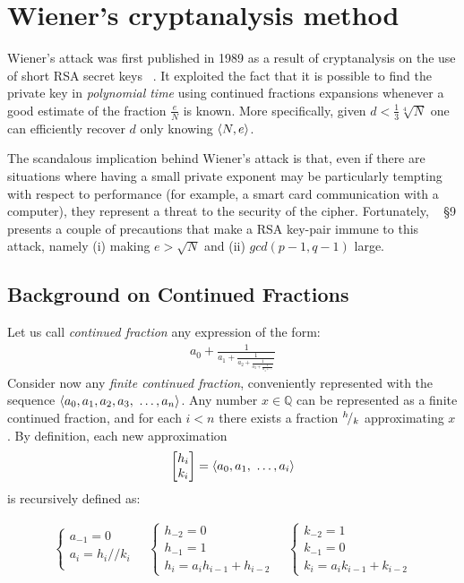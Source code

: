 \chapter{Wiener's cryptanalysis method \label{chap:wiener}}

Wiener's attack was first published in 1989 as a result of cryptanalysis on the
use of short RSA secret keys ~\cite{wiener}. It exploited the fact that it is
possible to find the private key in \emph{polynomial time} using continued fractions
expansions whenever a good estimate of the fraction $\frac{e}{N}$ is known.
More specifically, given $d < \frac{1}{3} \sqrt[4]{N}$ one can efficiently
recover $d$ only knowing $\langle N, e\rangle$.

The scandalous implication behind Wiener's attack is that, even if there are
situations where having a small private exponent may be
particularly tempting with respect to performance (for example, a smart card
communication with a computer), they represent a threat to the security of the
cipher.
Fortunately, ~\cite{wiener} \S 9 presents a couple of precautions that make a
RSA key-pair immune to this attack, namely
(i) making $e > \sqrt{N}$ and
(ii) $gcd(p-1, q-1)$ large.

\section{Background on Continued Fractions \label{sec:wiener:cf}}

Let us call \emph{continued fraction} any expression of the form:
\begin{align*}
a_0 + \frac{1}{a_1
    + \frac{1}{a_2
    + \frac{1}{a_3
    + \frac{1}{a_4 + \ldots}}}}
\end{align*}
Consider now any \emph{finite continued fraction}, conveniently represented with
the sequence
$\angular{a_0, a_1, a_2, a_3,  \ \ldots, a_n}$.
Any number $x \in \mathbb{Q}$ can be represented as a finite continued fraction,
and for each $i < n$ there exists a fraction ${}^{h}\!/_{k}$ approximating
$x$.
By definition, each new approximation
$$
\begin{bmatrix}
  h_i \\ k_i
\end{bmatrix}
=
\langle a_0, a_1, \ \ldots, a_i\rangle
$$
is recursively defined as:

\begin{align}
  \label{eq:wiener:cf}
  \begin{cases}
    a_{-1} = 0 \\
    a_i = h_i // k_i \\
  \end{cases}
  \quad
  \begin{cases}
    h_{-2} = 0 \\
    h_{-1} = 1 \\
    h_i = a_i h_{i-1} + h_{i-2}
  \end{cases}
  \quad
  \begin{cases}
    k_{-2} = 1 \\
    k_{-1} = 0  \\
    k_i = a_i k_{i-1} + k_{i-2}
  \end{cases}
\end{align}

